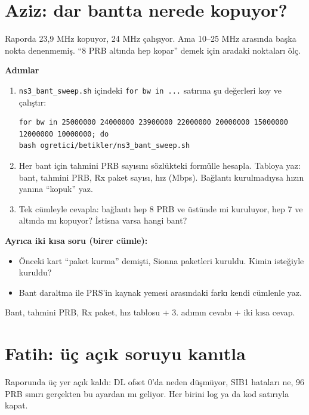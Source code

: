 \documentclass[11pt,a4paper]{article}
\begin{document}
\endgroup

\clearpage
\section*{Aziz: dar bantta nerede kopuyor?}
\begin{amac}
Raporda 23,9 MHz kopuyor, 24 MHz çalışıyor. Ama 10--25 MHz arasında başka nokta denenmemiş. ``8 PRB altında hep kopar'' demek için aradaki noktaları ölç.
\end{amac}

\textbf{Adımlar}
\begin{enumerate}[leftmargin=1.6em]
\item \texttt{ns3\_bant\_sweep.sh} içindeki \texttt{for bw in ...} satırına şu değerleri koy ve çalıştır:
\begin{lstlisting}
for bw in 25000000 24000000 23900000 22000000 20000000 15000000 12000000 10000000; do
bash ogretici/betikler/ns3_bant_sweep.sh
\end{lstlisting}
\item Her bant için tahmini PRB sayısını sözlükteki formülle hesapla. Tabloya yaz: bant, tahmini PRB, Rx paket sayısı, hız (Mbps). Bağlantı kurulmadıysa hızın yanına ``kopuk'' yaz.
\item Tek cümleyle cevapla: bağlantı hep 8 PRB ve üstünde mi kuruluyor, hep 7 ve altında mı kopuyor? İstisna varsa hangi bant?
\end{enumerate}

\textbf{Ayrıca iki kısa soru (birer cümle):}
\begin{itemize}[leftmargin=1.4em]
\item Önceki kart ``paket kurma'' demişti, Sionna paketleri kuruldu. Kimin isteğiyle kuruldu?
\item Bant daraltma ile PRS'in kaynak yemesi arasındaki farkı kendi cümlenle yaz.
\end{itemize}

\begin{teslim}
Bant, tahmini PRB, Rx paket, hız tablosu + 3. adımın cevabı + iki kısa cevap.
\end{teslim}

\clearpage
\section*{Fatih: üç açık soruyu kanıtla}
\begin{amac}
Raporunda üç yer açık kaldı: DL ofset 0'da neden düşmüyor, SIB1 hataları ne, 96 PRB sınırı gerçekten bu ayardan mı geliyor. Her birini log ya da kod satırıyla kapat.
\end{amac}
\end{document}
